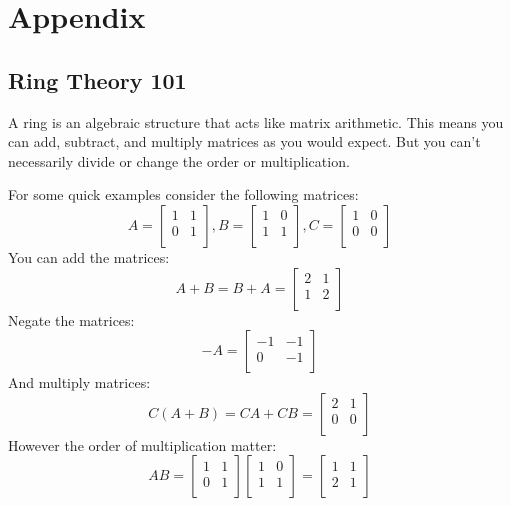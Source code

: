 
\chapter{Appendix}
\section{Ring Theory 101}
A ring is an algebraic structure that acts like matrix arithmetic.
This means you can add, subtract, and multiply matrices as you would expect.
But you can't necessarily divide or change the order or multiplication. 

For some quick examples consider the following matrices:
\[
A = \begin{bmatrix}
	1&1\\
	0&1\\
\end{bmatrix}
,B = \begin{bmatrix}
	1&0\\
	1&1\\
\end{bmatrix}
,C = \begin{bmatrix}
	1&0\\
	0&0\\
\end{bmatrix}
\]
You can add the matrices:
\[
A+B = B+A =
\begin{bmatrix}
	2&1\\
	1&2\\
\end{bmatrix}
\]
Negate the matrices:
\[
-A = \begin{bmatrix}
	-1&-1\\
	0&-1\\
\end{bmatrix}
\]
And multiply matrices:
\[
C(A+B) = CA+CB = 
\begin{bmatrix}
	2&1\\
	0&0\\
\end{bmatrix}
\]
However the order of multiplication matter:
\[
AB = 
\begin{bmatrix}
	1&1\\
	0&1\\
\end{bmatrix}
\begin{bmatrix}
	1&0\\
	1&1\\
\end{bmatrix}
=
\begin{bmatrix}
	1&1\\
	2&1\\
\end{bmatrix}
\]
